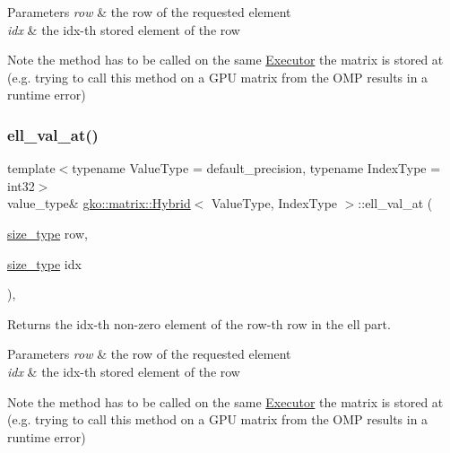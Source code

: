 \begin{DoxyParams}{Parameters}
{\em row} & the row of the requested element \\
\hline
{\em idx} & the idx-\/th stored element of the row\\
\hline
\end{DoxyParams}
\begin{DoxyNote}{Note}
the method has to be called on the same \hyperlink{classgko_1_1Executor}{Executor} the matrix is stored at (e.\+g. trying to call this method on a G\+PU matrix from the O\+MP results in a runtime error) 
\end{DoxyNote}
\mbox{\label{classgko_1_1matrix_1_1Hybrid_a5a0b57a9285424720218ff03dad6846c}} 
\subsubsection{\texorpdfstring{ell\+\_\+val\+\_\+at()}{ell\_val\_at()}\hspace{0.1cm}{\footnotesize\ttfamily [1/2]}}
{\footnotesize\ttfamily template$<$typename Value\+Type = default\+\_\+precision, typename Index\+Type = int32$>$ \\
value\+\_\+type\& \hyperlink{classgko_1_1matrix_1_1Hybrid}{gko\+::matrix\+::\+Hybrid}$<$ Value\+Type, Index\+Type $>$\+::ell\+\_\+val\+\_\+at (\begin{DoxyParamCaption}\item[{\hyperlink{namespacegko_a6e5c95df0ae4e47aab2f604a22d98ee7}{size\+\_\+type}}]{row,  }\item[{\hyperlink{namespacegko_a6e5c95df0ae4e47aab2f604a22d98ee7}{size\+\_\+type}}]{idx }\end{DoxyParamCaption})\hspace{0.3cm}{\ttfamily [inline]}, {\ttfamily [noexcept]}}



Returns the {\ttfamily idx}-\/th non-\/zero element of the {\ttfamily row}-\/th row in the ell part. 


\begin{DoxyParams}{Parameters}
{\em row} & the row of the requested element \\
\hline
{\em idx} & the idx-\/th stored element of the row\\
\hline
\end{DoxyParams}
\begin{DoxyNote}{Note}
the method has to be called on the same \hyperlink{classgko_1_1Executor}{Executor} the matrix is stored at (e.\+g. trying to call this method on a G\+PU matrix from the O\+MP results in a runtime error) 
\end{DoxyNote}
\mbox{\label{classgko_1_1matrix_1_1Hybrid_a3e0ab990e82db430d0e05fe165a11620}} 
